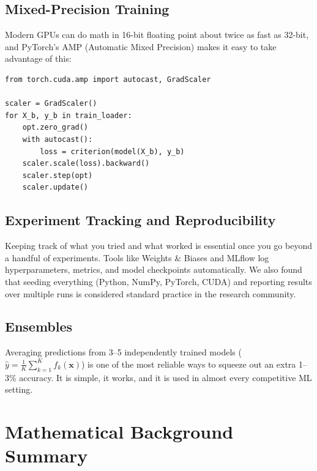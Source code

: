 \documentclass[12pt, letterpaper]{article}
\begin{document}
\subsection{Mixed-Precision Training}

Modern GPUs can do math in 16-bit floating point about twice as fast as 32-bit, and PyTorch's AMP (Automatic Mixed Precision) makes it easy to take advantage of this:

\noindent\begin{minipage}{\linewidth}
\begin{lstlisting}[caption={Mixed-precision training}]
from torch.cuda.amp import autocast, GradScaler

scaler = GradScaler()
for X_b, y_b in train_loader:
    opt.zero_grad()
    with autocast():
        loss = criterion(model(X_b), y_b)
    scaler.scale(loss).backward()
    scaler.step(opt)
    scaler.update()
\end{lstlisting}
\end{minipage}

\subsection{Experiment Tracking and Reproducibility}

Keeping track of what you tried and what worked is essential once you go beyond a handful of experiments. Tools like Weights \& Biases and MLflow log hyperparameters, metrics, and model checkpoints automatically. We also found that seeding everything (Python, NumPy, PyTorch, CUDA) and reporting results over multiple runs is considered standard practice in the research community.

\subsection{Ensembles}

Averaging predictions from 3--5 independently trained models ($\hat{y} = \frac{1}{K}\sum_{k=1}^{K} f_k(\mathbf{x})$) is one of the most reliable ways to squeeze out an extra 1--3\% accuracy. It is simple, it works, and it is used in almost every competitive ML setting.

\section{Mathematical Background Summary}
\end{document}
